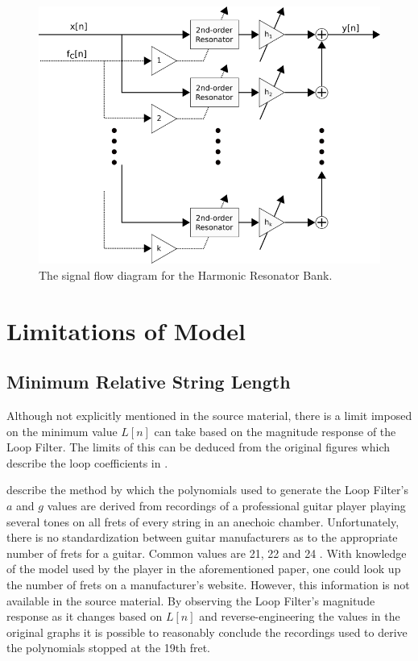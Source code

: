 \documentclass[../main.tex]{subfiles}
\begin{document}
\begin{figure}[h]
    \centering
    \includegraphics[scale=.5]{./images/diagrams/HarmonicResonatorBank.png}
    \caption{The signal flow diagram for the Harmonic Resonator Bank.}
    \label{fig:HRB}
\end{figure}

\section{Limitations of Model}
\subsection{Minimum Relative String Length}
\label{sec:MinL}
Although not explicitly mentioned in the source material, there is a limit imposed on the minimum value $L[n]$ can take based on the magnitude response of the Loop Filter. The limits of this can be deduced from the original figures which describe the loop coefficients in .

 describe the method by which the polynomials used to generate the Loop Filter's $a$ and $g$ values are derived from recordings of a professional guitar player playing several tones on all frets of every string in an anechoic chamber. Unfortunately, there is no standardization between guitar manufacturers as to the appropriate number of frets for a guitar. Common values are 21, 22 and 24 . With knowledge of the model used by the player in the aforementioned paper, one could look up the number of frets on a manufacturer's website. However, this information is not available in the source material. By observing the Loop Filter's magnitude response as it changes based on $L[n]$ and reverse-engineering the values in the original graphs it is possible to reasonably conclude the recordings used to derive the polynomials stopped at the 19th fret.
\end{document}

